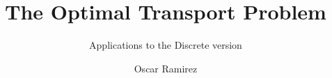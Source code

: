 \documentclass[whitelogo]{tudelft-report}
\begin{document}
\frontmatter


\title[tudelft-white]{The Optimal Transport Problem}
\subtitle[tudelft-black]{Applications to the Discrete version}
\author[tudelft-white]{Oscar Ramirez}
\makecover[split]






\tableofcontents

\mainmatter



\appendix

%


\end{document}
